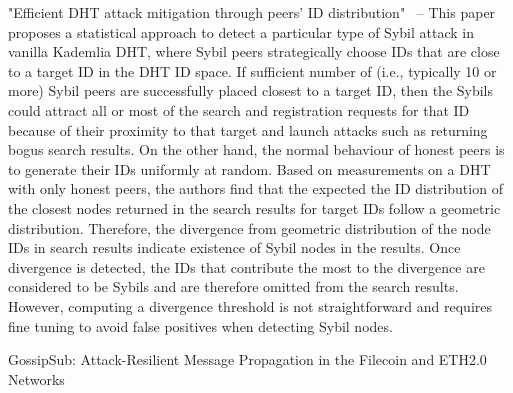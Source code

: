 "Efficient DHT attack mitigation through peers' ID distribution"~\cite{cholez2010efficient} – This paper proposes a statistical approach to detect a particular type of Sybil attack in vanilla Kademlia DHT, where Sybil peers strategically choose IDs that are close to a target ID in the DHT ID space. If sufficient number of (i.e., typically 10 or more) Sybil peers are successfully placed closest to a target ID, then the Sybils could attract all or most of the search and registration requests for that ID because of their proximity to that target and launch attacks such as returning bogus search results. On the other hand, the normal behaviour of honest peers is to generate their IDs uniformly at random. Based on measurements on a DHT with only honest peers, the authors find that the expected the ID distribution of the closest nodes returned in the search results for target IDs follow a geometric distribution. Therefore, the divergence from geometric distribution of the node IDs in search results indicate existence of Sybil nodes in the results. Once divergence is detected, the IDs that contribute the most to the divergence are considered to be Sybils and are therefore omitted from the search results. However, computing a divergence threshold is not straightforward and requires fine tuning to avoid false positives when detecting Sybil nodes.


GossipSub: Attack-Resilient Message Propagation in
the Filecoin and ETH2.0 Networks
